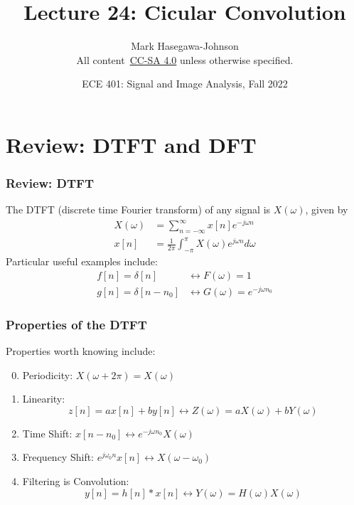 \documentclass{beamer}
\title{Lecture 24: Cicular Convolution}
\author{Mark Hasegawa-Johnson\\All content~\href{https://creativecommons.org/licenses/by-sa/4.0/}{CC-SA 4.0} unless otherwise specified.}
\date{ECE 401: Signal and Image Analysis, Fall 2022}
\begin{document}
\begin{frame}
  \maketitle
\end{frame}

\begin{frame}
  \tableofcontents
\end{frame}

\section[Review]{Review: DTFT and DFT}
\setcounter{subsection}{1}

\begin{frame}
  \frametitle{Review: DTFT}

  The DTFT (discrete time Fourier transform) of any signal is
  $X(\omega)$, given by
  \begin{align*}
    X(\omega) &= \sum_{n=-\infty}^\infty x[n]e^{-j\omega n}\\
    x[n] &= \frac{1}{2\pi}\int_{-\pi}^\pi X(\omega)e^{j\omega n}d\omega
  \end{align*}
  Particular useful examples include:
  \begin{align*}
    f[n]=\delta[n] &\leftrightarrow F(\omega)=1\\
    g[n]=\delta[n-n_0] &\leftrightarrow G(\omega)=e^{-j\omega n_0}
  \end{align*}
\end{frame}

\begin{frame}
  \frametitle{Properties of the DTFT}

  Properties worth knowing  include:
  \begin{enumerate}
    \setcounter{enumi}{-1}
  \item Periodicity: $X(\omega+2\pi)=X(\omega)$
  \item Linearity:
    \[z[n]=ax[n]+by[n]\leftrightarrow Z(\omega)=aX(\omega)+bY(\omega)
    \]
  \item Time Shift: $x[n-n_0]\leftrightarrow e^{-j\omega n_0}X(\omega)$
  \item Frequency Shift: $e^{j\omega_0 n}x[n]\leftrightarrow X(\omega-\omega_0)$
  \item Filtering is Convolution:
    \[
    y[n]=h[n]\ast x[n]\leftrightarrow Y(\omega)=H(\omega)X(\omega)
    \]
  \end{enumerate}
\end{frame}
\end{document}
